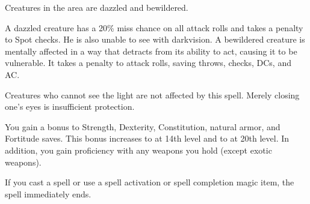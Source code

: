 \begin{spelleffect}
  Creatures in the area are dazzled and bewildered.
\end{spelleffect}
\begin{spellnotes}
  A dazzled creature has a 20\% miss chance on all attack rolls and takes a  penalty to Spot checks. He is also unable to see with darkvision. A bewildered creature is mentally affected in a way that detracts from its ability to act, causing it to be vulnerable. It takes a  penalty to attack rolls, saving throws, checks, DCs, and AC.

  Creatures who cannot see the light are not affected by this spell. Merely closing one's eyes is insufficient protection.
\end{spellnotes}

\spellrng{\rngpers}
\begin{spelleffect}
  You gain a  bonus to Strength, Dexterity, Constitution, natural armor, and Fortitude saves. This bonus increases to  at 14th level and to  at 20th level. In addition, you gain proficiency with any weapons you hold (except exotic weapons).
\end{spelleffect}
\begin{spellnotes}
  If you cast a spell or use a spell activation or spell completion magic item, the spell immediately ends.
\end{spellnotes}

